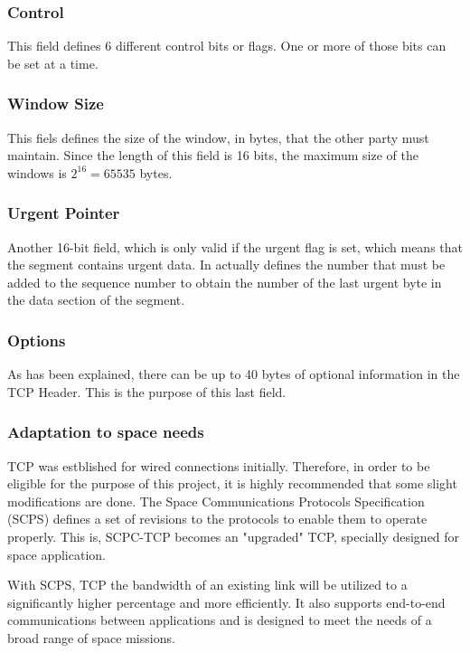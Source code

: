 \subsubsection*{Control}
This field defines 6 different control bits or flags. One or more of those bits can be set at a time. 

\subsubsection*{Window Size}
This fiels defines the size of the window, in bytes, that the other party must maintain. Since the length of this field is 16 bits, the maximum size of the windows is $2^{16}=65535$ bytes.  

\subsubsection*{Urgent Pointer}
Another 16-bit field, which is only valid if the urgent flag is set, which means that the segment contains urgent data. In actually defines the number that must be added to the sequence number to obtain the number of the last urgent byte in the data section of the segment. 

\subsubsection*{Options}
As has been explained, there can be up to 40 bytes of optional information in the TCP Header. This is the purpose of this last field. 

\subsubsection*{Adaptation to space needs}

TCP was estblished for wired connections initially. Therefore, in order to be eligible for the purpose of this project, it is highly recommended that some slight modifications are done. The Space Communications Protocols Specification (SCPS) defines a set of revisions to the protocols to enable them to operate properly. This is, SCPC-TCP becomes an "upgraded" TCP, specially designed for space application.  

With SCPS, TCP the bandwidth of an existing link will be utilized to a significantly higher percentage and more efficiently. It also supports end-to-end communications between applications and is designed to meet the needs of a broad range of space missions. 

